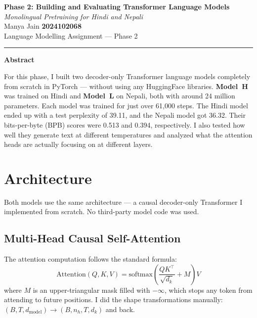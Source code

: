 \documentclass[11pt,a4paper]{article}
\begin{document}
\begin{center}
    {\LARGE\bfseries Phase 2: Building and Evaluating Transformer Language Models}\\[6pt]
    {\large\itshape Monolingual Pretraining for Hindi and Nepali}\\[10pt]
    {\normalsize Manya Jain \quad\textbf{2024102068}}\\[2pt]
    {\small Language Modelling Assignment --- Phase 2}\\[4pt]
    \hrule
\end{center}

\vspace{4pt}

\begin{center}\textbf{Abstract}\end{center}
\noindent
For this phase, I built two decoder-only Transformer language models completely from scratch in PyTorch --- without using any HuggingFace libraries. \textbf{Model~H} was trained on Hindi and \textbf{Model~L} on Nepali, both with around 24 million parameters. Each model was trained for just over 61{,}000 steps. The Hindi model ended up with a test perplexity of 39.11, and the Nepali model got 36.32. Their bits-per-byte (BPB) scores were 0.513 and 0.394, respectively. I also tested how well they generate text at different temperatures and analyzed what the attention heads are actually focusing on at different layers.

\vspace{6pt}

\section{Architecture}

Both models use the same architecture --- a causal decoder-only Transformer I implemented from scratch. No third-party model code was used.

\subsection{Multi-Head Causal Self-Attention}

The attention computation follows the standard formula:
\[
    \text{Attention}(Q, K, V) = \text{softmax}\!\left(\frac{QK^\top}{\sqrt{d_k}} + M\right) V
\]
where $M$ is an upper-triangular mask filled with $-\infty$, which stops any token from attending to future positions. I did the shape transformations manually: $(B, T, d_{\text{model}}) \to (B, n_h, T, d_k)$ and back.
\end{document}
